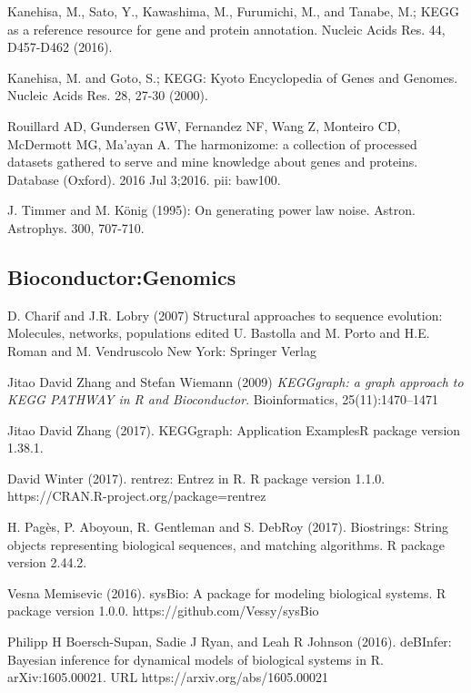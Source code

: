 \documentclass[preprint, 8pt]{elsarticle}
\theoremstyle{definition}
\begin{document}
\begin{thebibliography}{00}
 Kanehisa, M., Sato, Y., Kawashima, M., Furumichi, M., and Tanabe, M.; 
\newblock KEGG as a reference resource for gene and protein annotation. 
\newblock Nucleic Acids Res. 44, D457-D462 (2016).

 Kanehisa, M. and Goto, S.; 
\newblock KEGG: Kyoto Encyclopedia of Genes and Genomes. 
\newblock Nucleic Acids Res. 28, 27-30 (2000). 

 Rouillard AD, Gundersen GW, Fernandez NF, Wang Z, Monteiro CD, McDermott MG, Ma'ayan A. 
\newblock The harmonizome: a collection of processed datasets gathered to serve and mine knowledge about genes and proteins. 
\newblock Database (Oxford). 2016 Jul 3;2016. pii: baw100. 

 J. Timmer and M. König (1995): 
\newblock On generating power law noise. 
\newblock Astron. Astrophys. 300, 707-710.

\subsection{Bioconductor:Genomics}

D. Charif and J.R. Lobry (2007)
\newblock Structural approaches to sequence evolution: Molecules, networks, populations edited U. Bastolla and M. Porto and H.E. Roman and M. Vendruscolo 
\newblock New York: Springer Verlag

 Jitao David Zhang and Stefan Wiemann (2009)
\newblock \emph{KEGGgraph: a graph approach to KEGG PATHWAY in R and Bioconductor}.
\newblock Bioinformatics, 25(11):1470--1471

 Jitao David Zhang (2017). 
\newblock KEGGgraph: Application ExamplesR
\newblock package version 1.38.1.

 David Winter (2017). 
\newblock rentrez: Entrez in R. 
\newblock R package version 1.1.0. https://CRAN.R-project.org/package=rentrez

 H. Pagès, P. Aboyoun, R. Gentleman and S. DebRoy (2017).
\newblock Biostrings: String objects representing biological sequences, and matching algorithms. 
\newblock R package version 2.44.2.

 Vesna Memisevic (2016). 
\newblock sysBio: A package for modeling biological systems. 
\newblock R package version 1.0.0. https://github.com/Vessy/sysBio

 Philipp H Boersch-Supan, Sadie J Ryan, and Leah R Johnson (2016). 
\newblock deBInfer: Bayesian inference for dynamical models of biological systems in R. 
\newblock arXiv:1605.00021. URL https://arxiv.org/abs/1605.00021
	
\end{thebibliography}
\end{document}
